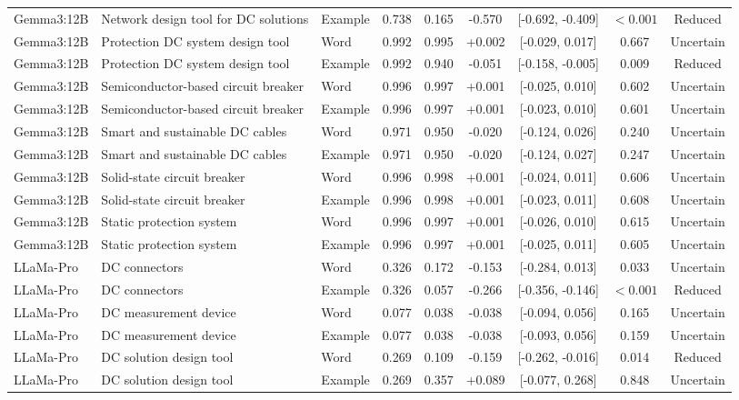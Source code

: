 \begin{landscape}
\begin{longtable}{lllcccccc}
Gemma3:12B & Network design tool for DC solutions & Example & 0.738 & 0.165 & -0.570 & [-0.692, -0.409] & $<0.001$ & Reduced \\
Gemma3:12B & Protection DC system design tool & Word & 0.992 & 0.995 & +0.002 & [-0.029, 0.017] & 0.667 & Uncertain \\
Gemma3:12B & Protection DC system design tool & Example & 0.992 & 0.940 & -0.051 & [-0.158, -0.005] & 0.009 & Reduced \\
Gemma3:12B & Semiconductor-based circuit breaker & Word & 0.996 & 0.997 & +0.001 & [-0.025, 0.010] & 0.602 & Uncertain \\
Gemma3:12B & Semiconductor-based circuit breaker & Example & 0.996 & 0.997 & +0.001 & [-0.023, 0.010] & 0.601 & Uncertain \\
Gemma3:12B & Smart and sustainable DC cables & Word & 0.971 & 0.950 & -0.020 & [-0.124, 0.026] & 0.240 & Uncertain \\
Gemma3:12B & Smart and sustainable DC cables & Example & 0.971 & 0.950 & -0.020 & [-0.124, 0.027] & 0.247 & Uncertain \\
Gemma3:12B & Solid-state circuit breaker & Word & 0.996 & 0.998 & +0.001 & [-0.024, 0.011] & 0.606 & Uncertain \\
Gemma3:12B & Solid-state circuit breaker & Example & 0.996 & 0.998 & +0.001 & [-0.023, 0.011] & 0.608 & Uncertain \\
Gemma3:12B & Static protection system & Word & 0.996 & 0.997 & +0.001 & [-0.026, 0.010] & 0.615 & Uncertain \\
Gemma3:12B & Static protection system & Example & 0.996 & 0.997 & +0.001 & [-0.025, 0.011] & 0.605 & Uncertain \\
LLaMa-Pro & DC connectors & Word & 0.326 & 0.172 & -0.153 & [-0.284, 0.013] & 0.033 & Uncertain \\
LLaMa-Pro & DC connectors & Example & 0.326 & 0.057 & -0.266 & [-0.356, -0.146] & $<0.001$ & Reduced \\
LLaMa-Pro & DC measurement device & Word & 0.077 & 0.038 & -0.038 & [-0.094, 0.056] & 0.165 & Uncertain \\
LLaMa-Pro & DC measurement device & Example & 0.077 & 0.038 & -0.038 & [-0.093, 0.056] & 0.159 & Uncertain \\
LLaMa-Pro & DC solution design tool & Word & 0.269 & 0.109 & -0.159 & [-0.262, -0.016] & 0.014 & Reduced \\
LLaMa-Pro & DC solution design tool & Example & 0.269 & 0.357 & +0.089 & [-0.077, 0.268] & 0.848 & Uncertain \\

\end{longtable}
\end{landscape}

